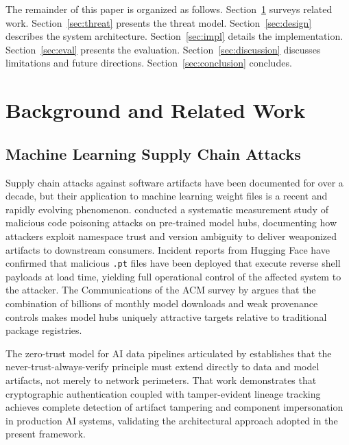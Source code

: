 \documentclass[preprint,12pt,twocolumn]{elsarticle}
\begin{document}
The remainder of this paper is organized as follows.
Section~\ref{sec:background} surveys related work. Section~\ref{sec:threat}
presents the threat model. Section~\ref{sec:design} describes the system
architecture. Section~\ref{sec:impl} details the implementation.
Section~\ref{sec:eval} presents the evaluation. Section~\ref{sec:discussion}
discusses limitations and future directions. Section~\ref{sec:conclusion}
concludes.

\section{Background and Related Work}
\label{sec:background}

\subsection{Machine Learning Supply Chain Attacks}

Supply chain attacks against software artifacts have been documented for
over a decade, but their application to machine learning weight files is
a recent and rapidly evolving phenomenon. \citet{modelsarecodes2024}
conducted a systematic measurement study of malicious code poisoning
attacks on pre-trained model hubs, documenting how attackers exploit
namespace trust and version ambiguity to deliver weaponized artifacts to
downstream consumers. Incident reports from Hugging Face have confirmed
that malicious \texttt{.pt} files have been deployed that execute reverse
shell payloads at load time, yielding full operational control of the
affected system to the attacker. The Communications of the ACM survey
by \citet{maliciousai2025} argues that the combination of billions of
monthly model downloads and weak provenance controls makes model hubs
uniquely attractive targets relative to traditional package registries.

The zero-trust model for AI data pipelines articulated by
\citet{mudusu2026zerotrust} establishes that the never-trust-always-verify
principle must extend directly to data and model artifacts, not merely to
network perimeters. That work demonstrates that cryptographic authentication
coupled with tamper-evident lineage tracking achieves complete detection of
artifact tampering and component impersonation in production AI systems,
validating the architectural approach adopted in the present framework.
\end{document}
